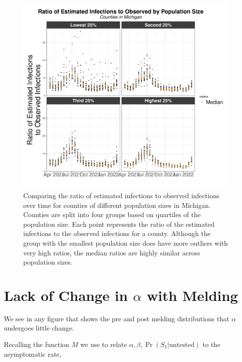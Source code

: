 \documentclass[12pt,twoside]{smiththesis}
\begin{document}
\begin{figure}

{\centering \includegraphics[width=1\linewidth]{figure/mi-ratio-pop} 

}

\caption{\label{fig:mi-ratio-pop}Comparing the ratio of estimated infections to observed infections over time for counties of different population sizes in Michigan. Counties are split into four groups based on quartiles of the population size. Each point represents the ratio of the estimated infections to the observed infections for a county. Although the group with the smallest population size does have more outliers with very high ratios, the median ratios are highly similar across population sizes.}\label{fig:unnamed-chunk-116}
\end{figure}
\newpage

\hypertarget{alpha-melding}{%
\section{\texorpdfstring{Lack of Change in \(\alpha\) with Melding}{Lack of Change in \textbackslash alpha with Melding}}\label{alpha-melding}}

We see in any figure that shows the pre and post melding distributions that \(\alpha\) undergoes little change.

Recalling the function \(M\) we use to relate \(\alpha,\beta,\Pr(S_1|\text{untested})\) to the asymptomatic rate,
\end{document}
